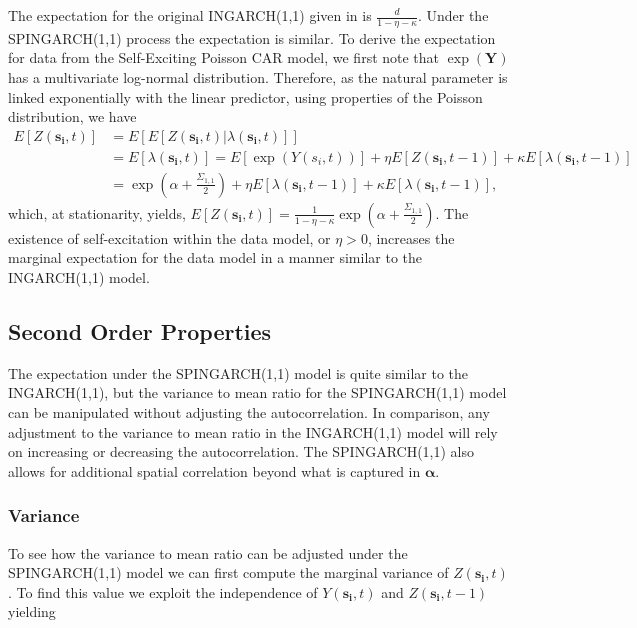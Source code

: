 \documentclass[11pt]{isuthesis}
\begin{document}
The expectation for the original INGARCH(1,1) given in \cite{ferland2006integer} is $\frac{d}{1-\eta-\kappa}$.  Under the SPINGARCH(1,1) process the expectation is similar.  To derive the expectation for data from the Self-Exciting Poisson CAR model, we first note that $\exp(\boldsymbol{Y})$ has a multivariate log-normal distribution.  Therefore, as the natural parameter is linked exponentially with the linear predictor, using properties of the Poisson distribution, we have 
\begin{align}
	E\left[Z(\boldsymbol{s_i},t)\right] & = E\left[E\left[Z(\boldsymbol{s_i},t)|\lambda(\boldsymbol{s_i},t)\right]\right] \nonumber\\
	&= E\left[\lambda(\boldsymbol{s_i},t)\right]= E\left[\exp(Y(s_i,t))\right]+\eta E\left[Z(\boldsymbol{s_i},t-1)\right] +\kappa E\left[\lambda(\boldsymbol{s_i},t-1)\right] \nonumber\\
	& = \exp\left(\alpha+\frac{\Sigma_{1,1}}{2}\right)+\eta E\left[\lambda(\boldsymbol{s_i},t-1)\right] +\kappa E\left[\lambda(\boldsymbol{s_i},t-1)\right] \label{eq:Expectation},
\end{align}
which, at stationarity, yields, $E\left[Z(\boldsymbol{s_i},t)\right]=\frac{1}{1-\eta-\kappa}\exp(\alpha+\frac{\Sigma_{1,1}}{2})$.  The existence of self-excitation within the data model, or $\eta>0$, increases the marginal expectation for the data model in a manner similar to the INGARCH(1,1) model.  

\subsection{Second Order Properties}
The expectation under the SPINGARCH(1,1) model is quite similar to the INGARCH(1,1), but the variance to mean ratio for the SPINGARCH(1,1) model can be manipulated without adjusting the autocorrelation.  In comparison, any adjustment to the variance to mean ratio in the INGARCH(1,1) model will rely on increasing or decreasing the autocorrelation.  The SPINGARCH(1,1) also allows for additional spatial correlation beyond what is captured in $\boldsymbol{\alpha}$.
\subsubsection{Variance}
To see how the variance to mean ratio can be adjusted under the SPINGARCH(1,1) model we can first compute the marginal variance of $Z(\boldsymbol{s_i},t)$. To find this value we exploit the independence of $Y(\boldsymbol{s_i},t)$ and $Z(\boldsymbol{s_i},t-1)$ yielding
\end{document}
